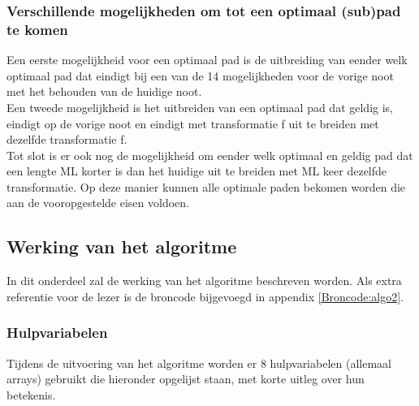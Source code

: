 \subsubsection{Verschillende mogelijkheden om tot een optimaal (sub)pad te komen} 
Een eerste mogelijkheid voor een optimaal pad is de uitbreiding van eender welk optimaal pad dat eindigt bij een van de 14 mogelijkheden voor de vorige noot met het behouden van de huidige noot.\\ 
Een tweede mogelijkheid is het uitbreiden van een optimaal pad dat geldig is, eindigt op de vorige noot en eindigt met transformatie f uit te breiden met dezelfde transformatie f.\\ 
Tot slot is er ook nog de mogelijkheid om eender welk optimaal en geldig pad dat een lengte ML korter is dan het huidige uit te breiden met ML keer dezelfde transformatie. Op deze manier kunnen alle optimale paden bekomen worden die aan de vooropgestelde eisen voldoen.

\subsection{Werking van het algoritme}
In dit onderdeel zal de werking van het algoritme beschreven worden. Als extra referentie voor de lezer is de broncode bijgevoegd in appendix \ref{Broncode:algo2}.\\

\subsubsection{Hulpvariabelen}
Tijdens de uitvoering van het algoritme worden er 8 hulpvariabelen (allemaal arrays) gebruikt die hieronder opgelijst staan, met korte uitleg over hun betekenis.

